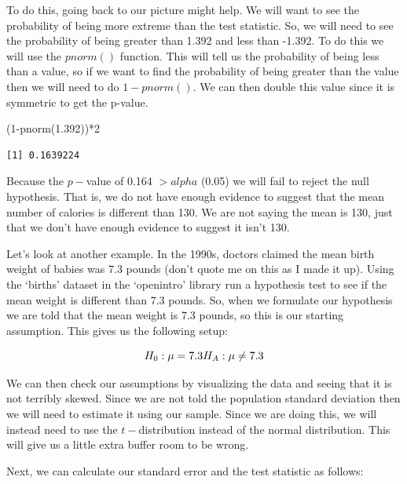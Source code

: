 \documentclass[
  letterpaper,
  DIV=11,
  numbers=noendperiod]{scrreprt}
\newenvironment{Shaded}{\begin{snugshade}}{\end{snugshade}}
\newcommand{\DecValTok}[1]{\textcolor[rgb]{0.68,0.00,0.00}{#1}}
\newcommand{\FloatTok}[1]{\textcolor[rgb]{0.68,0.00,0.00}{#1}}
\newcommand{\FunctionTok}[1]{\textcolor[rgb]{0.28,0.35,0.67}{#1}}
\newcommand{\NormalTok}[1]{\textcolor[rgb]{0.00,0.23,0.31}{#1}}
\newcommand{\SpecialCharTok}[1]{\textcolor[rgb]{0.37,0.37,0.37}{#1}}
\begin{document}
To do this, going back to our picture might help. We will want to see
the probability of being more extreme than the test statistic. So, we
will need to see the probability of being greater than 1.392 and less
than -1.392. To do this we will use the \(pnorm()\) function. This will
tell us the probability of being less than a value, so if we want to
find the probability of being greater than the value then we will need
to do \(1 - pnorm()\). We can then double this value since it is
symmetric to get the p-value.

\begin{Shaded}
\begin{Highlighting}[]
\NormalTok{(}\DecValTok{1}\SpecialCharTok{{-}}\FunctionTok{pnorm}\NormalTok{(}\FloatTok{1.392}\NormalTok{))}\SpecialCharTok{*}\DecValTok{2}
\end{Highlighting}
\end{Shaded}

\begin{verbatim}
[1] 0.1639224
\end{verbatim}

Because the \(p-\)value of 0.164 \(> alpha\) (0.05) we will fail to
reject the null hypothesis. That is, we do not have enough evidence to
suggest that the mean number of calories is different than 130. We are
not saying the mean is 130, just that we don't have enough evidence to
suggest it isn't 130.

Let's look at another example. In the 1990s, doctors claimed the mean
birth weight of babies was 7.3 pounds (don't quote me on this as I made
it up). Using the `births' dataset in the `openintro' library run a
hypothesis test to see if the mean weight is different than 7.3 pounds.
So, when we formulate our hypothesis we are told that the mean weight is
7.3 pounds, so this is our starting assumption. This gives us the
following setup:

\[ H_0: \mu = 7.3 \\ H_A: \mu \neq 7.3\]

We can then check our assumptions by visualizing the data and seeing
that it is not terribly skewed. Since we are not told the population
standard deviation then we will need to estimate it using our sample.
Since we are doing this, we will instead need to use the
\(t-\)distribution instead of the normal distribution. This will give us
a little extra buffer room to be wrong.

Next, we can calculate our standard error and the test statistic as
follows:
\end{document}
